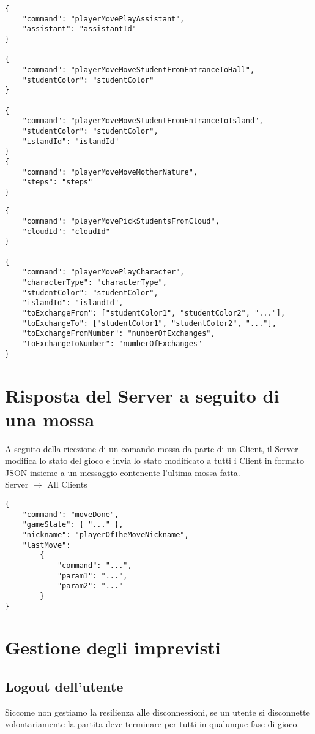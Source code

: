 \documentclass{article}
\begin{document}
\begin{verbatim}
{
	"command": "playerMovePlayAssistant",
	"assistant": "assistantId"
}

{
	"command": "playerMoveMoveStudentFromEntranceToHall",
	"studentColor": "studentColor"
}

{
	"command": "playerMoveMoveStudentFromEntranceToIsland",
	"studentColor": "studentColor",
	"islandId": "islandId"
}
{
	"command": "playerMoveMoveMotherNature",
	"steps": "steps"
}

\end{verbatim}
\newpage
\begin{verbatim}
{
	"command": "playerMovePickStudentsFromCloud",
	"cloudId": "cloudId"
}

{
	"command": "playerMovePlayCharacter",
	"characterType": "characterType",
	"studentColor": "studentColor",
	"islandId": "islandId",
	"toExchangeFrom": ["studentColor1", "studentColor2", "..."],
	"toExchangeTo": ["studentColor1", "studentColor2", "..."],
	"toExchangeFromNumber": "numberOfExchanges",
	"toExchangeToNumber": "numberOfExchanges"
}
\end{verbatim}


\bigskip
\section{Risposta del Server a seguito di una mossa}

A seguito della ricezione di un comando mossa da parte di un Client, il Server modifica lo stato del gioco e invia lo stato modificato a tutti i Client in formato JSON insieme a un messaggio contenente l'ultima mossa fatta.\\

\noindent Server $\rightarrow$ All Clients
\begin{verbatim}
{
	"command": "moveDone",
	"gameState": { "..." },
	"nickname": "playerOfTheMoveNickname",
	"lastMove":
	    {
	        "command": "...",
	        "param1": "...",
	        "param2": "..."
	    }
}
\end{verbatim}

\section{Gestione degli imprevisti}
\subsection{Logout dell'utente}\label{logout}
Siccome non gestiamo la resilienza alle disconnessioni, se un utente si disconnette volontariamente la partita deve terminare per tutti in qualunque fase di gioco.\\
\end{document}
